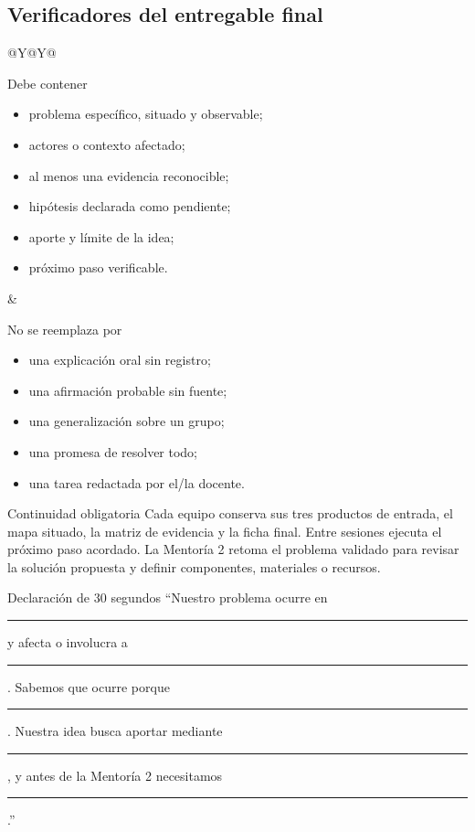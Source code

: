 \documentclass[10pt,a4paper]{article}
\begin{document}
\subsection{Verificadores del entregable final}
\begin{tabularx}{\textwidth}{@{}Y@{\hspace{5mm}}Y@{}}
\begin{docbox}[height=61mm]{Debe contener}
\begin{itemize}
  \item problema específico, situado y observable;
  \item actores o contexto afectado;
  \item al menos una evidencia reconocible;
  \item hipótesis declarada como pendiente;
  \item aporte y límite de la idea;
  \item próximo paso verificable.
\end{itemize}
\end{docbox}
&
\begin{docbox}[height=61mm]{No se reemplaza por}
\begin{itemize}
  \item una explicación oral sin registro;
  \item una afirmación probable sin fuente;
  \item una generalización sobre un grupo;
  \item una promesa de resolver todo;
  \item una tarea redactada por el/la docente.
\end{itemize}
\end{docbox}
\end{tabularx}

\begin{accentbox}{Continuidad obligatoria}
Cada equipo conserva sus tres productos de entrada, el mapa situado, la matriz de evidencia y la ficha final. Entre sesiones ejecuta el próximo paso acordado. La Mentoría 2 retoma el problema validado para revisar la solución propuesta y definir componentes, materiales o recursos.
\end{accentbox}

\begin{navybox}{Declaración de 30 segundos}
``Nuestro problema ocurre en \rule{24mm}{0.35pt} y afecta o involucra a \rule{24mm}{0.35pt}. Sabemos que ocurre porque \rule{24mm}{0.35pt}. Nuestra idea busca aportar mediante \rule{24mm}{0.35pt}, y antes de la Mentoría 2 necesitamos \rule{24mm}{0.35pt}.''
\end{navybox}
\end{document}
